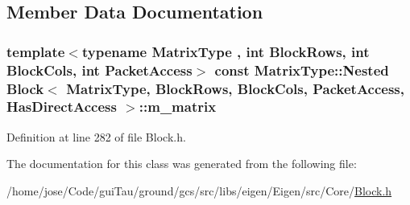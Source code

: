 \subsection{Member Data Documentation}
\hypertarget{class_block_3_01_matrix_type_00_01_block_rows_00_01_block_cols_00_01_packet_access_00_01_has_direct_access_01_4_afb211a50d07860391765ce11156a767e}{
\subsubsection[{m\-\_\-matrix}]{\setlength{\rightskip}{0pt plus 5cm}template$<$typename Matrix\-Type , int Block\-Rows, int Block\-Cols, int Packet\-Access$>$ const Matrix\-Type\-::\-Nested {\bf Block}$<$ Matrix\-Type, Block\-Rows, Block\-Cols, {\bf Packet\-Access}, {\bf Has\-Direct\-Access} $>$\-::m\-\_\-matrix\hspace{0.3cm}{\ttfamily [protected]}}}\label{class_block_3_01_matrix_type_00_01_block_rows_00_01_block_cols_00_01_packet_access_00_01_has_direct_access_01_4_afb211a50d07860391765ce11156a767e}


Definition at line 282 of file Block.\-h.



The documentation for this class was generated from the following file\-:\begin{DoxyCompactItemize}
\item 
/home/jose/\-Code/gui\-Tau/ground/gcs/src/libs/eigen/\-Eigen/src/\-Core/\hyperlink{_block_8h}{Block.\-h}\end{DoxyCompactItemize}

